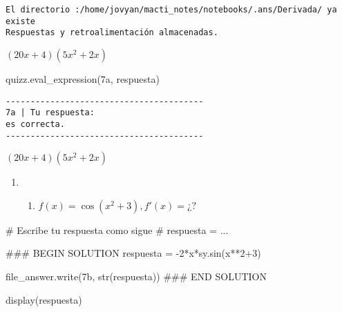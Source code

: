 \documentclass[
  letterpaper,
  DIV=11,
  numbers=noendperiod]{scrreprt}
\newenvironment{Shaded}{\begin{snugshade}}{\end{snugshade}}
\newcommand{\BuiltInTok}[1]{\textcolor[rgb]{0.00,0.23,0.31}{#1}}
\newcommand{\CommentTok}[1]{\textcolor[rgb]{0.37,0.37,0.37}{#1}}
\newcommand{\DecValTok}[1]{\textcolor[rgb]{0.68,0.00,0.00}{#1}}
\newcommand{\NormalTok}[1]{\textcolor[rgb]{0.00,0.23,0.31}{#1}}
\newcommand{\OperatorTok}[1]{\textcolor[rgb]{0.37,0.37,0.37}{#1}}
\newcommand{\RegionMarkerTok}[1]{\textcolor[rgb]{0.00,0.23,0.31}{#1}}
\newcommand{\StringTok}[1]{\textcolor[rgb]{0.13,0.47,0.30}{#1}}
\providecommand{\tightlist}{%
  \setlength{\itemsep}{0pt}\setlength{\parskip}{0pt}}\usepackage{longtable,booktabs,array}
\begin{document}
\begin{verbatim}
El directorio :/home/jovyan/macti_notes/notebooks/.ans/Derivada/ ya existe
Respuestas y retroalimentación almacenadas.
\end{verbatim}

$\displaystyle \left(20 x + 4\right) \left(5 x^{2} + 2 x\right)$

\begin{Shaded}
\begin{Highlighting}[]
\NormalTok{quizz.eval\_expression(}\StringTok{\textquotesingle{}7a\textquotesingle{}}\NormalTok{, respuesta)}
\end{Highlighting}
\end{Shaded}

\begin{verbatim}
----------------------------------------
7a | Tu respuesta:
es correcta.
----------------------------------------
\end{verbatim}

$\displaystyle \left(20 x + 4\right) \left(5 x^{2} + 2 x\right)$

\begin{enumerate}
\def\labelenumi{\arabic{enumi}.}
\setcounter{enumi}{6}
\tightlist
\item
  \begin{enumerate}
  \def\labelenumii{\alph{enumii}.}
  \setcounter{enumii}{1}
  \tightlist
  \item
    \(f(x) = \cos(x^2 +3), f'(x) = ¿?\)
  \end{enumerate}
\end{enumerate}

\begin{Shaded}
\begin{Highlighting}[]
\CommentTok{\# Escribe tu respuesta como sigue }
\CommentTok{\# respuesta = ...}

\CommentTok{\#\#\# }\RegionMarkerTok{BEGIN}\CommentTok{ SOLUTION}
\NormalTok{respuesta }\OperatorTok{=} \OperatorTok{{-}}\DecValTok{2}\OperatorTok{*}\NormalTok{x}\OperatorTok{*}\NormalTok{sy.sin(x}\OperatorTok{**}\DecValTok{2}\OperatorTok{+}\DecValTok{3}\NormalTok{)}

\NormalTok{file\_answer.write(}\StringTok{\textquotesingle{}7b\textquotesingle{}}\NormalTok{, }\BuiltInTok{str}\NormalTok{(respuesta))}
\CommentTok{\#\#\# }\RegionMarkerTok{END}\CommentTok{ SOLUTION}

\NormalTok{display(respuesta)}
\end{Highlighting}
\end{Shaded}
\end{document}
